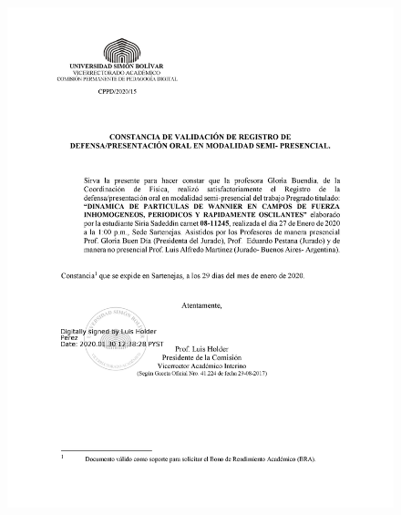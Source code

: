 \begin{figure}
    \centering
    \includegraphics[width=1\columnwidth]{imagenes/ConstanciadefensaTDDSiriaSadeddin.jpg}
\end{figure}

